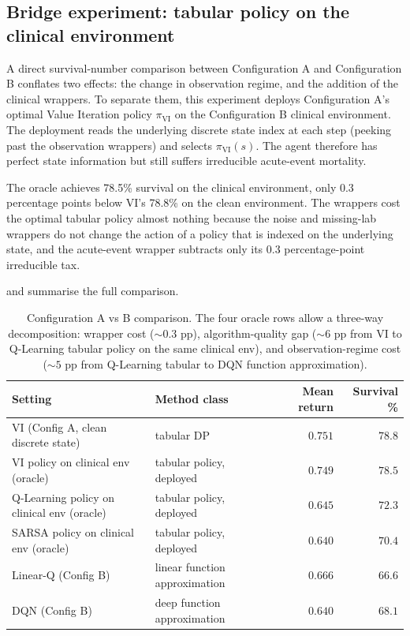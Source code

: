 \subsection{Bridge experiment: tabular policy on the clinical environment}
\label{sec:evaluation-bridge}

A direct survival-number comparison between Configuration A and Configuration B conflates two effects: the change in observation regime, and the addition of the clinical wrappers. To separate them, this experiment deploys Configuration A's optimal Value Iteration policy $\pi_\text{VI}$ on the Configuration B clinical environment. The deployment reads the underlying discrete state index at each step (peeking past the observation wrappers) and selects $\pi_\text{VI}(s)$. The agent therefore has perfect state information but still suffers irreducible acute-event mortality.

The oracle achieves 78.5\% survival on the clinical environment, only 0.3 percentage points below VI's 78.8\% on the clean environment. The wrappers cost the optimal tabular policy almost nothing because the noise and missing-lab wrappers do not change the action of a policy that is indexed on the underlying state, and the acute-event wrapper subtracts only its 0.3 percentage-point irreducible tax.

 and  summarise the full comparison.

\begin{table}[!htbp]
\centering
\small
\begin{tabular}{llrr}
\toprule
Setting & Method class & Mean return & Survival \% \\
\midrule
VI (Config A, clean discrete state)       & tabular DP                    & $0.751$ & $78.8$ \\
VI policy on clinical env (oracle)        & tabular policy, deployed       & $0.749$ & $78.5$ \\
Q-Learning policy on clinical env (oracle) & tabular policy, deployed       & $0.645$ & $72.3$ \\
SARSA policy on clinical env (oracle)      & tabular policy, deployed       & $0.640$ & $70.4$ \\
Linear-Q (Config B)                       & linear function approximation  & $0.666$ & $66.6$ \\
DQN (Config B)                            & deep function approximation    & $0.640$ & $68.1$ \\
\bottomrule
\end{tabular}
\caption{Configuration A vs B comparison. The four oracle rows allow a three-way decomposition: wrapper cost ($\sim 0.3$ pp), algorithm-quality gap ($\sim 6$ pp from VI to Q-Learning tabular policy on the same clinical env), and observation-regime cost ($\sim 5$ pp from Q-Learning tabular to DQN function approximation).}
\label{tab:comparison-AB}
\end{table}

